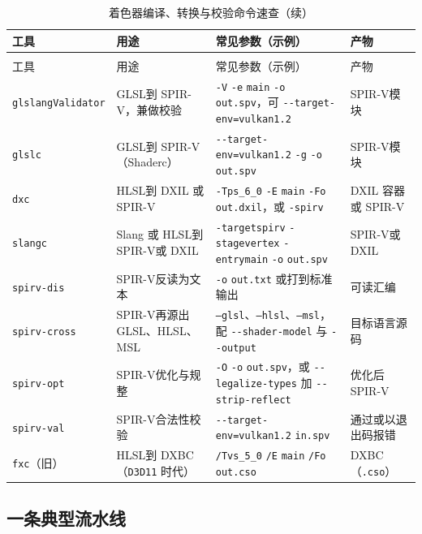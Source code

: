 \documentclass[12pt,a4paper,fontset=fandol]{ctexbook}
\newcommand{\Tp}[1]{\texttt{#1}}
\newcommand{\Opt}[1]{\texttt{-\/-#1}}
\newcommand{\Lang}[1]{\textsf{#1}}
\newcommand{\GSL}{\Lang{GLSL}}
\newcommand{\HSL}{\Lang{HLSL}}
\newcommand{\MSL}{\Lang{MSL}}
\newcommand{\SPIV}{\Lang{SPIR-V}}
\begin{document}
\begin{longtable}{>{\raggedright\arraybackslash}p{}
                  >{\raggedright\arraybackslash}p{}
                  >{\raggedright\arraybackslash}p{}
                  >{\raggedright\arraybackslash}p{}}
\caption{着色器编译、转换与校验命令速查}\label{tab:apB-tools} \\
\toprule
工具 & 用途 & 常见参数（示例） & 产物 \\
\midrule
\endfirsthead
\caption[]{着色器编译、转换与校验命令速查（续）}\\
\toprule
工具 & 用途 & 常见参数（示例） & 产物 \\
\midrule
\endhead
\bottomrule
\endfoot
\Tp{glslang}\allowbreak\Tp{Validator} & \GSL 到 \SPIV，兼做校验 & \Tp{-V} \Tp{-e} \Tp{main} \Tp{-o} \Tp{out.spv}，可 \Opt{target-env}\allowbreak\Tp{=vulkan1.2} & \SPIV 模块 \\
\Tp{glslc} & \GSL 到 \SPIV（Shaderc） & \Opt{target-env}\allowbreak\Tp{=vulkan1.2} \Tp{-g} \Tp{-o} \Tp{out.spv} & \SPIV 模块 \\
\Tp{dxc} & \HSL 到 DXIL 或 \SPIV & \Tp{-T}\allowbreak\Tp{ps\_6\_0} \Tp{-E} \Tp{main} \Tp{-Fo} \Tp{out.dxil}，或 \Tp{-spirv} & DXIL 容器或 \SPIV \\
\Tp{slangc} & Slang 或 \HSL 到 \SPIV 或 DXIL & \Tp{-target}\allowbreak\Tp{spirv} \Tp{-stage}\allowbreak\Tp{vertex} \Tp{-entry}\allowbreak\Tp{main} \Tp{-o} \Tp{out.spv} & \SPIV 或 DXIL \\
\Tp{spirv-dis} & \SPIV 反读为文本 & \Tp{-o} \Tp{out.txt} 或打到标准输出 & 可读汇编 \\
\Tp{spirv-cross} & \SPIV 再源出 \GSL、\HSL、\MSL & \Tp{--glsl}、\Tp{--hlsl}、\Tp{--msl}，配 \Opt{shader-model} 与 \Opt{output} & 目标语言源码 \\
\Tp{spirv-opt} & \SPIV 优化与规整 & \Tp{-O} \Tp{-o} \Tp{out.spv}，或 \Opt{legalize-types} 加 \Opt{strip-reflect} & 优化后 \SPIV \\
\Tp{spirv-val} & \SPIV 合法性校验 & \Opt{target-env}\allowbreak\Tp{=vulkan1.2} \Tp{in.spv} & 通过或以退出码报错 \\
\Tp{fxc}（旧） & \HSL 到 DXBC（\Tp{D3D11} 时代） & \Tp{/T}\allowbreak\Tp{vs\_5\_0} \Tp{/E} \Tp{main} \Tp{/Fo} \Tp{out.cso} & DXBC（\Tp{.cso}） \\
\end{longtable}

\subsection{一条典型流水线}
\end{document}
